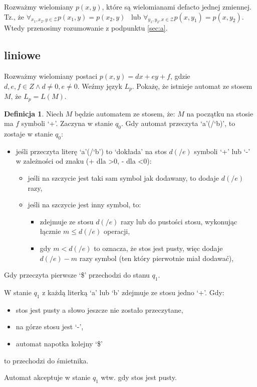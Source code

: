\documentclass{article}
\theoremstyle{definition}
\newtheorem{definition}{Definicja}[section]
\theoremstyle{remark}
\begin{document}
Rozważmy wielomiany \(p(x,y)\), które są wielomianami defacto jednej zmiennej. Tz., że
\(\forall_{x_1,x_2,y \in \mathcal{Z}} p(x_1,y)=p(x_2,y)\) \ 
lub \(\forall_{y_1,y_2,x \in \mathcal{Z}} p(x,y_1)=p(x,y_2)\). Wtedy przenosimy rozumowanie z podpunktu \ref{sec:a}.

\subsection{liniowe}\label{sec:b:lin}
Rozważmy wielomiany postaci \(p(x,y)=dx + ey + f\), gdzie \(d,e,f \in Z \land d \neq 0, e \neq 0\).
Weźmy język \(L_p\). Pokażę, że istnieje automat ze stosem \(M\),
że \(L_p = L(M)\).

\begin{definition}
    Niech \(M\) będzie automatem ze stosem, że:
    \(M\) na początku na stosie ma \(f\) symboli `+'.
    Zaczyna w stanie \(q_0\).
    Gdy automat przeczyta `a'(/`b)', to zostaje w stanie \(q_0\):
    \begin{itemize}
        \item jeśli przeczyta literę `a'(/`b') to `dokłada' na stos \(d(/e)\) symboli `+' lub `-' w zależności od znaku (+ dla >0, - dla <0):
        \begin{itemize}
            \item jeśli na szczycie jest taki sam symbol jak dodawany, to dodaje \(d(/e)\) razy,
            \item jeśli na szczycie jest inny symbol, to:
            \begin{itemize}
                \item zdejmuje ze stosu \(d(/e)\) razy lub do pustości stosu, wykonując łącznie \(m \leq d(/e)\) operacji,
                \item gdy \(m < d(/e)\) to oznacza, że stos jest pusty, więc dodaje \(d(/e) - m\) razy symbol (ten który pierwotnie miał dodawać),
            \end{itemize}
        \end{itemize}
    \end{itemize}

    Gdy przeczyta pierwsze `\$' przechodzi do stanu \(q_1\).

    W stanie \(q_1\) z każdą literką `a' lub `b' zdejmuje ze stosu jedno `+'.
    Gdy:
    \begin{itemize}
        \item stos jest pusty a słowo jeszcze nie zostało przeczytane,
        \item na górze stosu jest `-',
        \item automat napotka kolejny `\$'
    \end{itemize}
    to przechodzi do śmietnika.

    Automat akceptuje w stanie \(q_1\) wtw. gdy stos jest pusty.
\end{definition}
\end{document}
